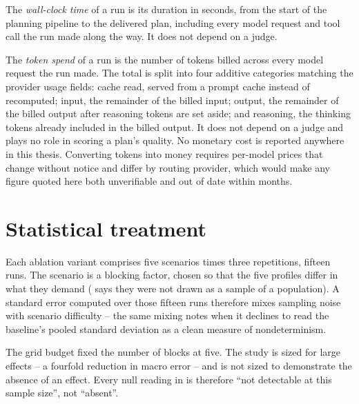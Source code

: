 \begin{definition}
    \label{def:wall-clock-time}
    The \emph{wall-clock time} of a run is its duration in seconds, from the start of the planning pipeline to the delivered plan, including every model request and tool call the run made along the way. It does not depend on a judge.
\end{definition}

\begin{definition}
    \label{def:token-spend}
    The \emph{token spend} of a run is the number of tokens billed across every model request the run made. The total is split into four additive categories matching the provider usage fields: cache read, served from a prompt cache instead of recomputed; input, the remainder of the billed input; output, the remainder of the billed output after reasoning tokens are set aside; and reasoning, the thinking tokens already included in the billed output. It does not depend on a judge and plays no role in scoring a plan's quality. No monetary cost is reported anywhere in this thesis. Converting tokens into money requires per-model prices that change without notice and differ by routing provider, which would make any figure quoted here both unverifiable and out of date within months.
\end{definition}

\section{Statistical treatment}
\label{sec:methodology-statistics}

Each ablation variant comprises five scenarios times three repetitions, fifteen runs. The scenario is a blocking factor, chosen so that the five profiles differ in what they demand ( says they were not drawn as a sample of a population). A standard error computed over those fifteen runs therefore mixes sampling noise with scenario difficulty -- the same mixing  notes when it declines to read the baseline's pooled standard deviation as a clean measure of nondeterminism.

The grid budget fixed the number of blocks at five. The study is sized for large effects -- a fourfold reduction in macro error -- and is not sized to demonstrate the absence of an effect. Every null reading in  is therefore \enquote{not detectable at this sample size}, not \enquote{absent}.

